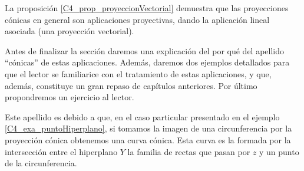 La proposición \ref*{C4_prop_proyeccionVectorial} demuestra que las proyecciones cónicas en general son aplicaciones proyectivas, dando la aplicación lineal asociada (una proyección vectorial).

Antes de finalizar la sección daremos una explicación del por qué del apellido ``cónicas'' de estas aplicaciones. Además, daremos dos ejemplos detallados para que el lector se familiarice con el tratamiento de estas aplicaciones, y que, además, constituye un gran repaso de capítulos anteriores. Por último propondremos un ejercicio al lector.

\begin{obs}[Cónicas]
	\label{C4_obs_conicas}
	Este apellido es debido a que, en el caso particular presentado en el ejemplo \ref{C4_exa_puntoHiperplano}, si tomamos la imagen de una circunferencia por la proyección cónica obtenemos una curva cónica. Esta curva es la formada por la intersección entre el hiperplano $Y$ la familia de rectas que pasan por $z$ y un punto de la circunferencia.
\end{obs}

